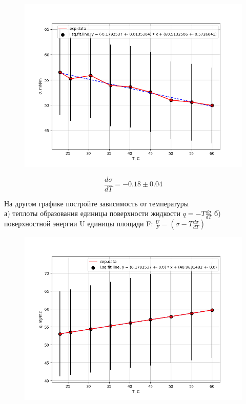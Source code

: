 \documentclass[a4paper,12pt]{article} %
\begin{document}
\begin{figure}[h!]
\begin{floatrow}
         {\includegraphics[scale=0.75]{physlabwork_13week_dsigmadT.png}}     
\end{floatrow}
\end{figure}

\begin{equation*}
    \frac{d \sigma}{dT} = -0.18 \pm 0.04
\end{equation*}

\newpage
На другом графике постройте зависимость от температуры \\
а) теплоты образования единицы поверхности жидкости $ q = - T \frac{d \sigma}{dT}$
б) поверхностной энергии U единицы площади F: $ \frac{U}{F} = ( \sigma - T \frac{d \sigma}{dT})$

\begin{figure}[h!]
\begin{floatrow}
         {\includegraphics[scale=0.65]{physlabwork_13week_dqdT.png}}     
\end{floatrow}
\end{figure}
\end{document}
